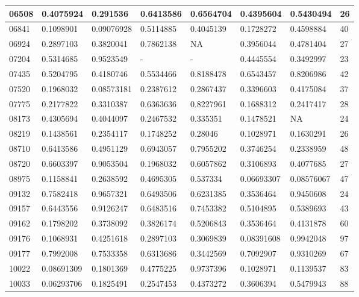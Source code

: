 \begin{anexosenv}
\begin{table}[H]
{\begin{tabular}{|l|l|l|l|l|l|l|l|}
						06508 & 0.4075924 & 0.291536 & 0.6413586 & 0.6564704 & 0.4395604 & 0.5430494 & 26 \\ \hline
						06841 & 0.1098901 & 0.09076928 & 0.5114885 & 0.4045139 & 0.1728272 & 0.4598884 & 40 \\ \hline
						06924 & 0.2897103 & 0.3820041 & 0.7862138 & NA & 0.3956044 & 0.4781404 & 27 \\ \hline
						07204 & 0.5314685 & 0.9523549 & - & - & 0.4445554 & 0.3492997 & 23 \\ \hline
						07435 & 0.5204795 & 0.4180746 & 0.5534466 & 0.8188478 & 0.6543457 & 0.8206986 & 42 \\ \hline
						07520 & 0.1968032 & 0.08573181 & 0.2387612 & 0.2867437 & 0.3396603 & 0.4175084 & 37 \\ \hline
						07775 & 0.2177822 & 0.3310387 & 0.6363636 & 0.8227961 & 0.1688312 & 0.2417417 & 28 \\ \hline
						08173 & 0.4305694 & 0.4044097 & 0.2467532 & 0.335351 & 0.1478521 & NA & 24 \\ \hline
						08219 & 0.1438561 & 0.2354117 & 0.1748252 & 0.28046 & 0.1028971 & 0.1630291 & 26 \\ \hline
						08710 & 0.6413586 & 0.4951129 & 0.6943057 & 0.7955202 & 0.3746254 & 0.2338959 & 48 \\ \hline
						08720 & 0.6603397 & 0.9053504 & 0.1968032 & 0.6057862 & 0.3106893 & 0.4077685 & 27 \\ \hline
						08975 & 0.1158841 & 0.2638592 & 0.4695305 & 0.537334 & 0.06693307 & 0.08576067 & 47 \\ \hline
						09132 & 0.7582418 & 0.9657321 & 0.6493506 & 0.6231385 & 0.3536464 & 0.9450608 & 24 \\ \hline
						09157 & 0.6443556 & 0.9126247 & 0.6483516 & 0.7453382 & 0.5104895 & 0.5389693 & 43 \\ \hline
						09162 & 0.1798202 & 0.3738092 & 0.3826174 & 0.5206843 & 0.3536464 & 0.4131878 & 60 \\ \hline
						09176 & 0.1068931 & 0.4251618 & 0.2897103 & 0.3069839 & 0.08391608 & 0.9942048 & 97 \\ \hline
						09177 & 0.7992008 & 0.7533358 & 0.6313686 & 0.3442569 & 0.7092907 & 0.9310269 & 67 \\ \hline
						10022 & 0.08691309 & 0.1801369 & 0.4775225 & 0.9737396 & 0.1028971 & 0.1139537 & 83 \\ \hline
						10033 & 0.06293706 & 0.1825491 & 0.2547453 & 0.4373272 & 0.3606394 & 0.5479943 & 88 \\ \hline

\end{tabular}}
\end{table}
\end{anexosenv}
